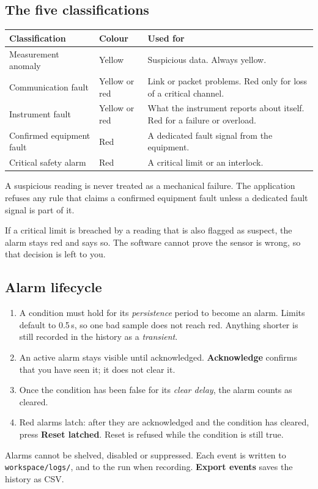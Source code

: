 \documentclass[11pt,a4paper]{article}
\newcommand{\ui}[1]{\textbf{#1}}
\newcommand{\key}[1]{\texttt{#1}}
\begin{document}
\subsection{The five classifications}
\begin{longtable}{@{}p{38mm}p{16mm}p{97mm}@{}}\toprule
Classification & Colour & Used for\\\midrule\endhead
Measurement anomaly & Yellow & Suspicious data. Always yellow.\\
Communication fault & Yellow or red & Link or packet problems. Red only for loss of a critical channel.\\
Instrument fault & Yellow or red & What the instrument reports about itself. Red for a failure or overload.\\
Confirmed equipment fault & Red & A dedicated fault signal from the equipment.\\
Critical safety alarm & Red & A critical limit or an interlock.\\\bottomrule
\end{longtable}
A suspicious reading is never treated as a mechanical failure. The application refuses any rule that claims a
confirmed equipment fault unless a dedicated fault signal is part of it.

If a critical limit is breached by a reading that is also flagged as suspect, the alarm stays red and says so.
The software cannot prove the sensor is wrong, so that decision is left to you.

\subsection{Alarm lifecycle}
\begin{enumerate}
\item A condition must hold for its \emph{persistence} period to become an alarm. Limits default to 0.5\,s, so one bad sample does not reach red. Anything shorter is still recorded in the history as a \emph{transient}.
\item An active alarm stays visible until acknowledged. \ui{Acknowledge} confirms that you have seen it; it does not clear it.
\item Once the condition has been false for its \emph{clear delay}, the alarm counts as cleared.
\item Red alarms latch: after they are acknowledged and the condition has cleared, press \ui{Reset latched}. Reset is refused while the condition is still true.
\end{enumerate}
Alarms cannot be shelved, disabled or suppressed. Each event is written to \key{workspace/logs/}, and to the
run when recording. \ui{Export events} saves the history as CSV.
\end{document}
